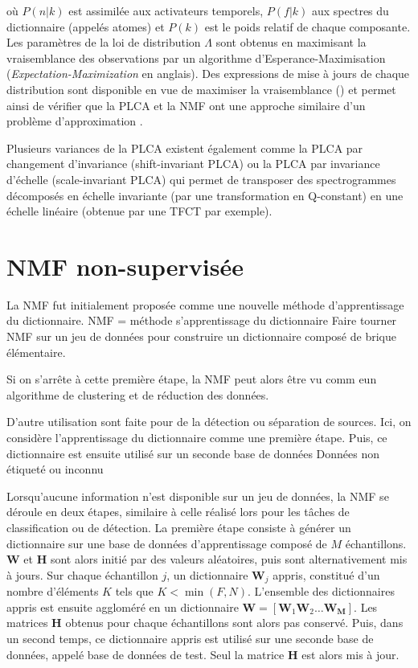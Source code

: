 où $P\left( n \vert k \right)$ est assimilée aux activateurs temporels, $P\left(f \vert k \right)$ aux spectres du dictionnaire (appelés atomes) et $P\left(k \right)$ est le poids relatif de chaque composante. Les paramètres de la loi de distribution $\Lambda$ sont obtenus en maximisant la vraisemblance des observations par un algorithme d'{Esperance-Maximisation} (\textit{Expectation-Maximization} en anglais). Des expressions de mise à jours de chaque distribution sont disponible en vue de maximiser la vraisemblance (\cite{shashanka_probabilistic_2008}) et permet ainsi de vérifier que la PLCA et la NMF ont une approche similaire d'un problème d'approximation \cite{gaussier_relation_2005}.

Plusieurs variances de la PLCA existent également comme la PLCA par changement d'invariance (shift-invariant PLCA) \cite{smaragdis_shift-invariant_2007} ou la PLCA par invariance d'échelle (scale-invariant PLCA) \cite{hennequin_scale-invariant_2011} qui permet de transposer des spectrogrammes décomposés en échelle invariante (par une transformation en Q-constant) en une échelle linéaire (obtenue par une TFCT par exemple). 

\section{NMF non-supervisée}

La NMF fut initialement proposée comme une nouvelle méthode d'apprentissage du dictionnaire. 
NMF = méthode s'apprentissage du dictionnaire
Faire tourner NMF sur un jeu de données pour construire un dictionnaire composé de brique élémentaire. 

Si on s'arrête à cette première étape, la NMF peut alors être vu comm eun algorithme de clustering et de réduction des données. 

D'autre utilisation sont faite pour de la détection ou séparation de sources. Ici, on considère l'apprentissage du dictionnaire comme une première étape. Puis, ce dictionnaire est ensuite utilisé sur un seconde base de données
Données non étiqueté ou inconnu

Lorsqu'aucune information n'est disponible sur un jeu de données, la NMF se déroule en deux étapes, similaire à celle réalisé lors pour les tâches de classification ou de détection. La première étape consiste à générer un dictionnaire sur une base de données d'apprentissage composé de $M$ échantillons. $\mathbf{W}$ et $\mathbf{H}$ sont alors initié par des valeurs aléatoires, puis sont alternativement mis à jours. 
Sur chaque échantillon $j$, un dictionnaire $\mathbf{W}_j$ appris, constitué d'un nombre d'éléments $K$ tels que $K < \min(F,N)$. L'ensemble des dictionnaires appris est ensuite aggloméré en un dictionnaire $\mathbf{W} = \left[ \mathbf{W}_1 \mathbf{W}_2 \dots \mathbf{W_M} \right]$. Les matrices $\mathbf{H}$ obtenus pour chaque échantillons sont alors pas conservé. 
Puis, dans un second temps, ce dictionnaire appris est utilisé sur une seconde base de données, appelé base de données de test. Seul la matrice $\mathbf{H}$ est alors mis à jour. 

